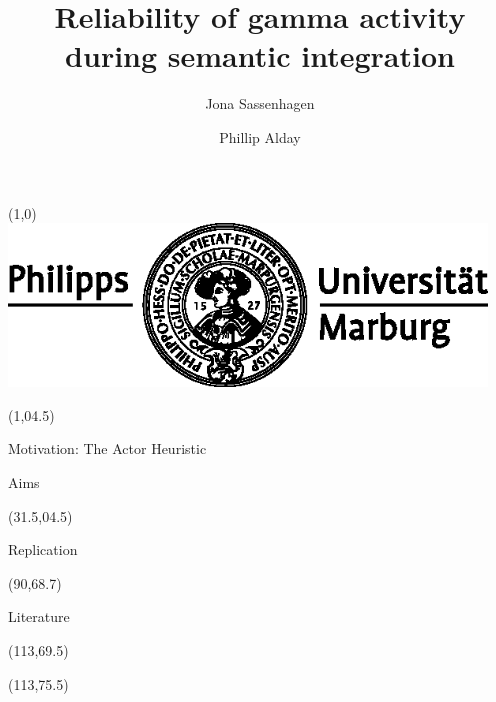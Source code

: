 \documentclass[final]{beamer}
\title{Reliability of gamma activity during semantic integration}
\author{Jona Sassenhagen \and Phillip Alday}
\institute{University of Marburg}
\date{}
\newcommand{\subblock}[1]{\bigskip\textbf{#1}}
\begin{document}
\begin{frame}{} 	
\begin{textblock}{15}(1,0)
\includegraphics[width=5in]{marburg-logo-blackwhite.eps}
\end{textblock}


\begin{textblock}{29}(1,04.5)
\begin{block}{Motivation: The Actor Heuristic}

\end{block}

\begin{block}{Aims}
\end{block}

\end{textblock}

\begin{textblock}{57}(31.5,04.5)
\begin{block}{Replication}
\end{block}
\end{textblock}


\begin{textblock}{21.5}(90,68.7)
\begin{block}{Literature}
\tiny
%
%
\end{block}
\end{textblock}

\begin{textblock}{10}(113,69.5)
\end{textblock}
\begin{textblock}{10}(113,75.5)
\end{textblock}

\end{frame}
\end{document}
